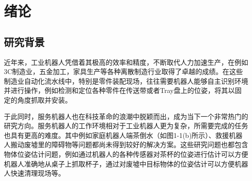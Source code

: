 \chapter{绪论}

\section{研究背景}


近年来，工业机器人凭借着其极高的效率和精度，不断取代人力加速生产，在例如3C制造业，五金加工，家具生产等各种离散制造行业取得了卓越的成绩。在这些制造业自动化流水线中，特别是零件装配现场，往往需要机器人能够自主识别环境并进行操作，例如检测和定位各种零件在传送带或者Tray盘上的位姿，将其以固定的角度抓取并安装。

于此同时，服务机器人也在科技革命的浪潮中脱颖而出，成为当下一个非常热门的研究方向。服务机器人的工作环境相对于工业机器人更为复杂，所需要完成的任务也具有更高的难度。其中例如家庭机器人端茶倒水（如图1-1(b)所示）、救援机器人搬动废墟里的障碍物等问题都尚未得到较好的解决方案。这些研究问题也都包含物体位姿估计问题，例如通过机器人的各种传感器对茶杯的位姿进行估计可以方便机器人准确地从桌子上抓取杯子，通过对废墟中目标物体的位姿估计可以方便机器人快速清理现场等。



